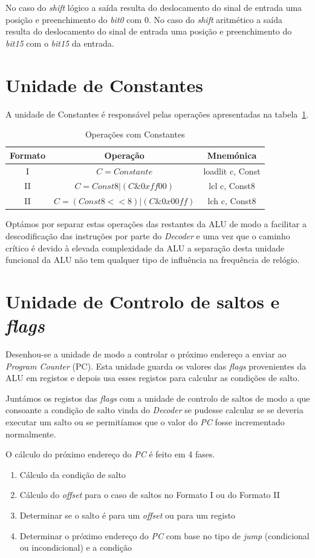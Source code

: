 No caso do \textit{shift} lógico a saída resulta do deslocamento do sinal de entrada uma posição e preenchimento do \textit{bit0} com 0. No caso do \textit{shift} aritmético a saída resulta do deslocamento do sinal de entrada uma posição e preenchimento do \textit{bit15} com o \textit{bit15} da entrada.\\

\section{Unidade de Constantes}
A unidade de Constantes é responsável pelas operações apresentadas na tabela~\ref{tabela:constantes}.
\begin{table}[h]
	\centering
	\begin{tabular}{|c|c|c|}
		\hline
		Formato & Operação & Mnemónica \\ \hline
		I & \mbox{$C=Constante$} & loadlit c, Const  \\ \hline
		II & \mbox{$C=Const8|(C\&0xff00)$}  & lcl c, Const8 \\ \hline
		II & \mbox{$C=(Const8<<8)|(C\&0x00ff)$}  & lch c, Const8 \\ \hline
	\end{tabular}
	\caption{Operações com Constantes}
	\label{tabela:constantes}
\end{table}

Optámos por separar estas operações das restantes da ALU de modo a facilitar a descodificação das instruções por parte do \textit{Decoder} e uma vez que o caminho crítico é devido à elevada complexidade da ALU a separação desta unidade funcional da ALU não tem qualquer tipo de influência na frequência de relógio.

\section{Unidade de Controlo de saltos e \textit{flags}}
Desenhou-se a unidade de modo a controlar o próximo endereço a enviar ao \textit{Program Counter} (PC). Esta unidade guarda os valores das \textit{flags} provenientes da ALU em registos e depois usa esses registos para calcular as condições de salto.\par
Juntámos os registos das \textit{flags} com a unidade de controlo de saltos de modo a que consoante a condição de salto vinda do \textit{Decoder} se pudesse calcular se se deveria executar um salto ou se permitíamos que o valor do \textit{PC} fosse incrementado normalmente.\par
O cálculo do próximo endereço do \textit{PC} é feito em 4 fases.
\begin{enumerate}
	\setlength{\itemindent}{25pt}
	\item Cálculo da condição de salto
	\item Cálculo do \textit{offset} para o caso de saltos no Formato I ou do Formato II
	\item Determinar se o salto é para um \textit{offset} ou para um registo
	\item Determinar o próximo endereço do \textit{PC} com base no tipo de \textit{jump} (condicional ou incondicional) e a condição
\end{enumerate}

